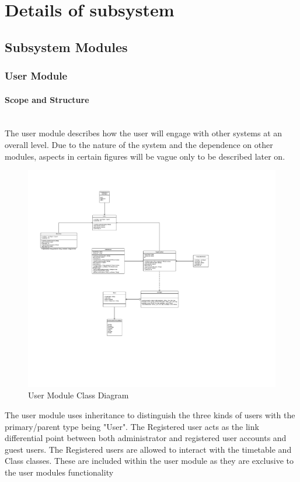 \documentclass{article}
\begin{document}
	\newpage	
	\section{Details of subsystem}
	\subsection{Subsystem Modules}
		\subsubsection{User Module}
		\paragraph{Scope and Structure}\mbox{} \\
		The user module describes how the user will engage with other systems at an overall level. Due to the nature of the system and the dependence on other modules, aspects in certain figures will be vague only to be described later on.
		\begin{figure}[h]
			\includegraphics[width=\textwidth]{./Images/User_class_diagram_finished.png}
			\caption{User Module Class Diagram} 
		\end{figure}
		{The user module uses inheritance to distinguish the three kinds of users with the primary/parent type being "User". The Registered user acts as the link differential point between both administrator and registered user accounts and guest users. The Registered users are allowed to interact with the timetable and Class classes. These are included within the user module as they are exclusive to the user modules functionality}
		
\end{document}
